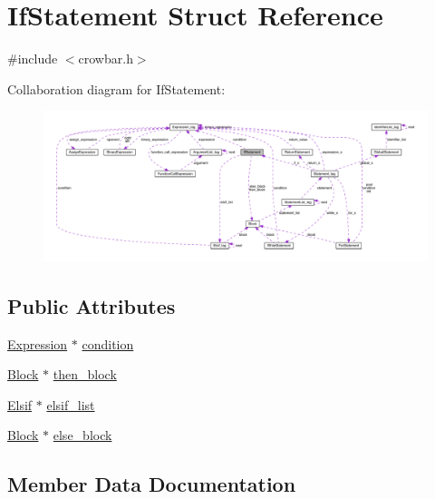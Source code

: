 \hypertarget{struct_if_statement}{}\section{If\+Statement Struct Reference}
\label{struct_if_statement}


{\ttfamily \#include $<$crowbar.\+h$>$}



Collaboration diagram for If\+Statement\+:\nopagebreak
\begin{figure}[H]
\begin{center}
\leavevmode
\includegraphics[width=350pt]{struct_if_statement__coll__graph}
\end{center}
\end{figure}
\subsection*{Public Attributes}
\begin{DoxyCompactItemize}
\item 
\hyperlink{crowbar_8h_a070c6feb370aad8a9665ca315bf6ed4a}{Expression} $\ast$ \hyperlink{struct_if_statement_a2f94ffdf006915378fd04adcca34decd}{condition}
\item 
\hyperlink{struct_block}{Block} $\ast$ \hyperlink{struct_if_statement_aa3ad1531bae5272926856f65fa9109a6}{then\+\_\+block}
\item 
\hyperlink{crowbar_8h_a8d2ba32155a8a8a5a87e93c564061f1d}{Elsif} $\ast$ \hyperlink{struct_if_statement_a9fca446be841301fe78695d38c69f5e5}{elsif\+\_\+list}
\item 
\hyperlink{struct_block}{Block} $\ast$ \hyperlink{struct_if_statement_ab2fa316c9e48259809b33d1551a072fa}{else\+\_\+block}
\end{DoxyCompactItemize}


\subsection{Member Data Documentation}
\hypertarget{struct_if_statement_a2f94ffdf006915378fd04adcca34decd}{}
